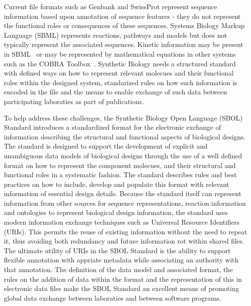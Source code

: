 Current file formats such as Genbank and SwissProt represent sequence information based upon annotation of sequence features - they do not represent the functional roles or consequences of these sequences. Systems Biology Markup Language (SBML) represents reactions, pathways and models but does not typically represent the associated sequences.  Kinetic information may be present in SBML~\cite{SBML} or may be represented by mathematical equations in other systems such as the COBRA Toolbox~\cite{COBRA}. Synthetic Biology needs a structured standard with defined ways on how to represent relevant molecues and their functional roles within the designed system, standarized rules on how such information is encoded in the file and the means to enable exchange of such data between participating laboraties as part of publications. 


To help address these challenges, the Synthetic Biology Open Language (SBOL) Standard introduces a standardized format for the electronic exchange of information describing the structural and functional aspects of biological designs. The standard is designed to support the development of explicit and unambiguous data models of biological designs through the use of a well defined format on how to represent the component molecues, and their structural and functional roles in a systematic fashion. The standard describes rules and best practices on how to include, develop and populate this format with relevant information of essential design details. Because the standard itself can represent information from other sources for sequence representations, reaction information and ontologies to represent biological design information, the standard uses modern information exchange techniques such as Universal Resource Identifiers (URIs). This permits the reuse of existing information without the need to repeat it, thus avoiding both redundancy and future information rot within shared files. The ultimate utility of URIs in the SBOL Standard is the ability to support flexible annotation with appriate metadata while associating an authority with that annotation. The definition of the data model and associated format, the rules on the addition of data within the format and the representation of this in electronic data files make the SBOL Standard an excellent means of promoting global data exchange between laboraties and between software programs.

